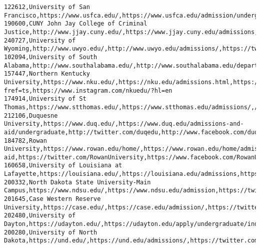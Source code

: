 \documentclass[11pt]{article}
\begin{document}
\begin{Verbatim}[commandchars=\\\{\}]
122612,University of San Francisco,https://www.usfca.edu/,https://www.usfca.edu/admission/undergraduate,https://twitter.com/usfca,https://www.facebook.com/University.of.San.Francisco,http://instagram.com/usfca
190600,CUNY John Jay College of Criminal Justice,http://www.jjay.cuny.edu/,https://www.jjay.cuny.edu/admissions,https://www.twitter.com/JohnJayResearch,https://www.facebook.com/johnjaycollege,https://instagram.com/johnjaycollege
240727,University of Wyoming,http://www.uwyo.edu/,http://www.uwyo.edu/admissions/,https://twitter.com/uwyonews,https://www.facebook.com/uwpride,https://www.instagram.com/uofwyoming/
102094,University of South Alabama,http://www.southalabama.edu/,http://www.southalabama.edu/departments/admissions/,https://twitter.com/UofSouthAlabama,https://www.facebook.com/theuniversityofsouthalabama,http://instagram.com/uofsouthalabama
157447,Northern Kentucky University,https://www.nku.edu/,https://nku.edu/admissions.html,https://twitter.com/nkuedu,https://www.facebook.com/nkuedu/?fref=ts,https://www.instagram.com/nkuedu/?hl=en
174914,University of St Thomas,https://www.stthomas.edu/,https://www.stthomas.edu/admissions/,//twitter.com/UofStThomasMN/,//www.facebook.com/UofStThomasMN/,//instagram.com/uofstthomasmn\#
212106,Duquesne University,https://www.duq.edu/,https://www.duq.edu/admissions-and-aid/undergraduate,http://twitter.com/duqedu,http://www.facebook.com/duquesneuniversityoftheholyspirit,http://www.instagram.com/duquesneuniversity
184782,Rowan University,https://www.rowan.edu/home/,https://www.rowan.edu/home/admissions-aid,https://twitter.com/RowanUniversity,https://www.facebook.com/RowanUniversity,https://www.instagram.com/p/BpZdJIinlzT/
160658,University of Louisiana at Lafayette,https://louisiana.edu/,https://louisiana.edu/admissions,https://twitter.com/ULLafayette,https://www.facebook.com/officialullafayette,https://www.instagram.com/p/BpZc5GmngcU/
200332,North Dakota State University-Main Campus,https://www.ndsu.edu/,https://www.ndsu.edu/admission,https://twitter.com/ndsu/,https://www.facebook.com/ndsu.fargo,https://www.instagram.com/ndsu\_official/
201645,Case Western Reserve University,https://case.edu/,https://case.edu/admission/,https://twitter.com/cwru,https://www.facebook.com/casewesternreserve,https://instagram.com/cwru/
202480,University of Dayton,https://udayton.edu/,https://udayton.edu/apply/undergraduate/index.php,https://twitter.com/univofdayton,https://www.facebook.com/univofdayton/,https://www.instagram.com/universityofdayton/
200280,University of North Dakota,https://und.edu/,https://und.edu/admissions/,https://twitter.com/UofNorthDakota,https://www.facebook.com/UofNorthDakota,https://www.instagram.com/p/BpZjlXgAx\_D/

\end{Verbatim}
\end{document}
